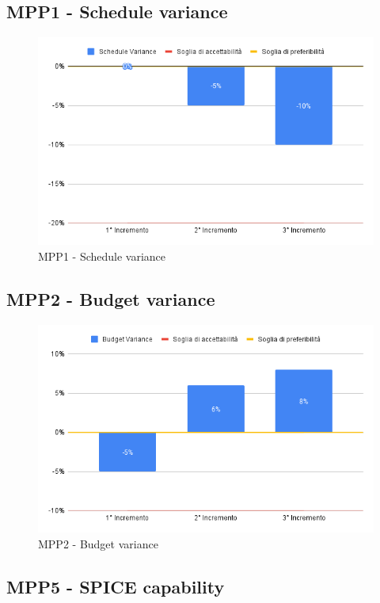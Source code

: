 \subsection{MPP1 - Schedule variance}

\begin{figure}[H]
	\centering
	\includegraphics[scale = 0.6]{sezioni/Images/ScheduleVariance.png}
	\caption{MPP1 - Schedule variance}
\end{figure}

\subsection{MPP2 - Budget variance}

\begin{figure}[H]
	\centering
	\includegraphics[scale = 0.6]{sezioni/Images/BudgetVariance.png}
	\caption{MPP2 - Budget variance}
\end{figure}

\subsection{MPP5 - SPICE capability}

